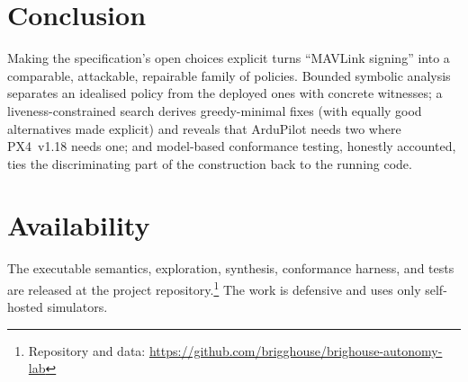 \documentclass[conference]{IEEEtran}
\begin{document}
\section{Conclusion}
Making the specification's open choices explicit turns ``MAVLink signing'' into a
comparable, attackable, repairable family of policies. Bounded symbolic analysis
separates an idealised policy from the deployed ones with concrete witnesses; a
liveness-constrained search derives greedy-minimal fixes (with equally good
alternatives made explicit) and reveals that ArduPilot needs two where PX4~v1.18
needs one; and model-based conformance testing, honestly accounted, ties the
discriminating part of the construction back to the running code.

\section*{Availability}
The executable semantics, exploration, synthesis, conformance harness, and tests
are released at the project repository.\footnote{Repository and data: \url{https://github.com/brigghouse/brighouse-autonomy-lab}} The work is defensive and uses only self-hosted simulators.



\end{document}
